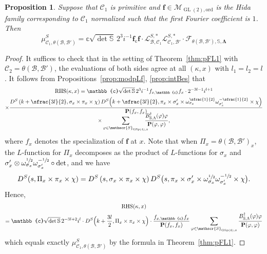 \documentclass[JEP,XML,SOM,Unicode,published]{cedram}
\newcommand{\Lfunction}{$L$\nobreakdash-func\-tion\xspace}
\newcommand{\Lfunctions}{$L$\nobreakdash-func\-tions\xspace}
\theoremstyle{plain}
\newtheorem{prop}[thm]{Proposition}
\theoremstyle{remark}
\newcommand{\bS}{\mathbb{S}}
\newcommand{\bbc}{\mathbb{c}}
\newcommand{\cF}{\mathcal{F}}
\newcommand{\cL}{\mathcal{L}}
\newcommand{\cM}{\mathcal{M}}
\newcommand{\sB}{\mathscr{B}}
\newcommand{\sC}{\mathscr{C}}
\newcommand{\sS}{\mathscr{S}}
\newcommand{\bfP}{\mathbf{P}}
\DeclareMathOperator{\GL}{GL}
\DeclareMathOperator{\GSp}{GSp}
\newcommand{\ord}{\mathrm{ord}}
\let\bes B
\newcommand{\bLam}{\boldsymbol\Lambda}
\begin{document}
\begin{prop}\label{prop:compare}
Suppose that $\sC_1$ is primitive and $\bm{f}\in \cM_{\GL(2),\ord}$ is the Hida family corresponding to $\sC_1$ normalized such that the first Fourier coefficient is $1$. Then
\begin{equation}\label{eq:compare}
\mu^S_{\sC_1,\theta(\sB,\sB')}
=\bbc\sqrt{\det\bS}\,2^{3}i^{-1} {\bm f}_{\bbc}{\bm f}\cdot \cL^{S,\ast}_{\sB,\sC_1}\cL^{S,\ast}_{\sC_1,\sB'} \cdot \cF_{\theta(\sB,\sB'),\bS,\bLam}
\end{equation}
\end{prop}
\begin{proof}
It suffices to check that in the setting of Theorem~\ref{thm:pFL1} with $\sC_2=\theta(\sB,\sB')$, the evaluations of both sides agree at all $(\kappa,x)$ with $l_1=l_2=l$. It follows from Propositions~\ref{prop:modpLf}, \ref{prop:intBes} that
\begin{multline*}
\text{RHS}(\kappa,x)=\bbc\sqrt{\det\bS}\,2^{3}i^{-1} f_{x,\bbc}f_x\cdot 2^{-3l-1}i^{l+1}\\
\times\frac{D^S\left(k+\sfrac{3l}{2},\sigma_x\times\pi_x\times\chi\right) D^S\Bigl(k+\sfrac{3l}{2},\pi_x\times\sigma'_x\times\omega^{\sfrac{1}{2}}_{\sigma_x}\omega^{-\sfrac{1}{2}}_{\sigma'_x}\times\chi\Bigr)}{\bfP(f_x,f_x)}
\\[-8pt]
\times\sum_{\varphi\in \sS_{\GSp(4),x}}\hspace{-3mm}\frac{\bes^\dagger_{\bS,\Lambda}(\varphi)\varphi}{\bfP(\varphi,\varphi)},
\end{multline*}
where $f_x$ denotes the specialization of ${\bm f}$ at $x$. Note that when $\Pi_x=\theta(\sB,\sB')_x$, the \Lfunction for $\Pi_x$ decomposes as the product of \Lfunctions for $\sigma_x$ and \hbox{$\sigma'_x\otimes \omega^{\sfrac{1}{2}}_{\sigma_x}\omega^{-\sfrac{1}{2}}_{\sigma'_x}\circ\det$}, and we have
\[
D^S(s,\Pi_x\times\pi_x\times\chi)=D^S\left(s,\sigma_x\times\pi_x\times\chi\right) D^S\bigl(s,\pi_x\times\sigma'_x\times\omega^{\sfrac{1}{2}}_{\sigma_x}\omega^{-\sfrac{1}{2}}_{\sigma'_x}\times\chi\bigr).
\]
Hence,
\begin{multline*}
\text{RHS}(\kappa,x)\\
=\bbc\sqrt{\det\bS}\, 2^{-3l+2} i^{l} \cdot D^S\Bigl(k+\frac{3l}{2},\Pi_x\times\pi_x\times\chi\Bigr)\cdot \frac{f_{x,\bbc}f_x}{\bfP(f_x,f_x)}\sum_{\varphi\in \sS_{\GSp(4),x}}\frac{\bes^\dagger_{\bS,\Lambda}(\varphi)\varphi}{\bfP(\varphi,\varphi)}
\end{multline*}
which equals exactly $\mu^S_{\sC_1,\theta(\sB,\sB')}$ by the formula in Theorem~\ref{thm:pFL1}.
\end{proof}
\end{document}
